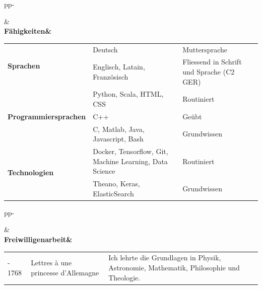 \documentclass[a4paper, 8pt]{extarticle}
\newlength{\headerColumn}
\newlength{\firstColumn}
\newlength{\lastColumn}
\newlength\savedwidth
\newcommand\whline[1]{\arrayrulecolor{hbar}\noalign{\global\savedwidth\arrayrulewidth\global\arrayrulewidth 2pt}%
\cline{#1}
\noalign{\global\arrayrulewidth\savedwidth}}
\begin{document}
\begin{tabular}[t]{p{\headerColumn}p{\textwidth-\headerColumn-8mm}}
	\whline{2-2}&\\
	\Large\bfseries\raggedleft Fähigkeiten&
\begin{tabular}[t]{p{\firstColumn}p{\textwidth-\firstColumn-\lastColumn-\headerColumn-16mm}p{\lastColumn}}
	\multirow[t]{2}{\firstColumn}{\raggedleft \textbf{Sprachen}}
	 & \raggedleft
	Deutsch 
	& Muttersprache\\
	& \raggedleft Englisch, Latain, Französisch 
	& Fliessend in Schrift und Sprache (C2 GER)\\
	\cline{2-3} 
	\multirow[t]{3}{\firstColumn}{
		\hspace{0pt}\raggedleft \textbf{Programmiersprachen}
	} & \raggedleft
	Python, Scala, HTML, CSS 
	& Routiniert\\
	& \raggedleft C++ 
	& Geübt\\
	& \raggedleft C, Matlab, Java, Javascript, Bash 
	& Grundwissen\\
	\cline{2-3} 
	\multirow[t]{2}{\firstColumn}{\raggedleft \textbf{Technologien}} & \raggedleft
	Docker, Tensorflow, Git, Machine Learning, Data Science 
	& Routiniert\\
	&\raggedleft Theano, Keras, ElasticSearch 
	& Grundwissen\\
\end{tabular}
\end{tabular}



\begin{tabular}[t]{p{\headerColumn}p{\textwidth-\headerColumn-8mm}}
	\whline{2-2}&\\
	\hspace{0pt}\Large\bfseries\raggedleft Freiwilligenarbeit&
\begin{tabular}[t]{p{\firstColumn}p{\textwidth-\firstColumn-\lastColumn-\headerColumn-16mm}p{\lastColumn}}
\raggedleft 1768 - 1768 & Lettres à une princesse d'Allemagne & Ich lehrte die Grundlagen in Physik, Astronomie, Mathematik, Philosophie und Theologie.\\
\end{tabular}
\end{tabular}
\end{document}
